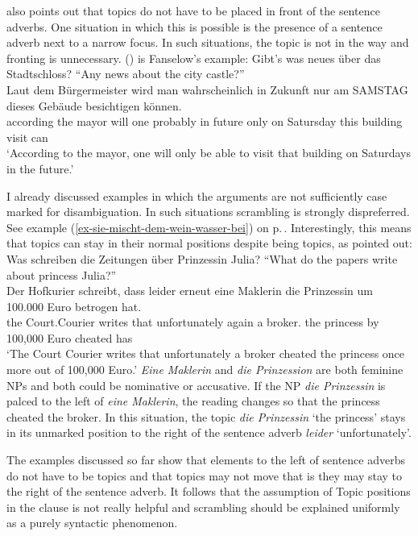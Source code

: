 \largerpage
\citet{Fanselow2006a} also points out that topics do not have to be placed in front of the sentence
adverbs. One situation in which this is possible is the presence of a sentence adverb next to a
narrow focus. In such situations, the topic is not in the way and fronting is unnecessary. ()
is Fanselow's example:
\ea
Gibt's was neues über das Stadtschloss? ``Any news about the city castle?''\\
\gll Laut dem Bürgermeister wird man wahrscheinlich in Zukunft nur am SAMSTAG dieses Gebäude besichtigen können.\\ 
     according the mayor will one probably in future only on Satursday this building visit can\\
\glt `According to the mayor, one will only be able to visit that building on Saturdays in the future.'
\z

\noindent
I already discussed examples in which the arguments are not sufficiently case marked for
disambiguation. In such situations scrambling is strongly dispreferred. See example (\ref{ex-sie-mischt-dem-wein-wasser-bei}) on p.\,\pageref{ex-sie-mischt-dem-wein-wasser-bei}. Interestingly, this means
that topics can stay in their normal positions despite being topics, as \citet{Fanselow2006a}
pointed out:
\ea
Was schreiben die Zeitungen über Prinzessin Julia? ``What do the papers write about princess Julia?''\\
\gll Der Hofkurier     schreibt, dass leider        erneut eine Maklerin    die Prinzessin um 100.000 Euro betrogen hat.\\
     the Court.Courier writes    that unfortunately again  a    broker.\F{} the princess   by 100,000 Euro cheated has\\
\glt `The Court Courier writes that unfortunately a broker cheated the princess once more out of 100,000 Euro.'
\z
\emph{Eine Maklerin} and \emph{die Prinzession} are both feminine NPs and both could be nominative or
accusative. If the NP \emph{die Prinzessin} is palced to the left of \emph{eine Maklerin}, the reading changes so that the princess cheated the
broker. In this situation, the topic \emph{die Prinzessin} `the princess' stays in its unmarked position to the right of the
sentence adverb \emph{leider} `unfortunately'. 

The examples discussed so far show that elements to the left of
sentence adverbs do not have to be topics and that topics may not move that is they may stay to the
right of the sentence adverb. It follows that the assumption of Topic positions in the clause is not
really helpful and scrambling should be explained uniformly as a purely syntactic phenomenon.

